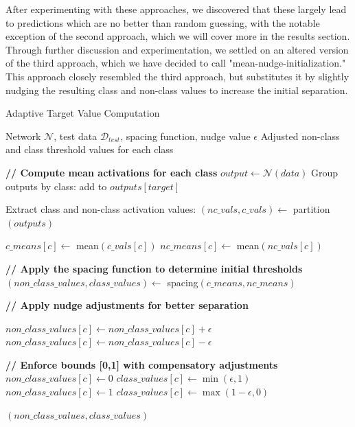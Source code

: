 \documentclass[12pt,fleqn,a4paper]{article}
\begin{document}
After experimenting with these approaches, we discovered that these largely lead to predictions which are no better than random guessing, with the notable exception of the second approach, which we will cover more in the results section. Through further discussion and experimentation, we settled on an altered version of the third approach, which we have decided to call "mean-nudge-initialization."
This approach closely resembled the third approach, but substitutes it by slightly nudging the resulting class and non-class values to increase the initial separation. 

\begin{algorithm}
\caption{Adaptive Target Value Computation}
\label{alg:adaptive_threshold}
\begin{algorithmic}[1]
\REQUIRE Network $\mathcal{N}$, test data $\mathcal{D}_{test}$, spacing function, nudge value $\epsilon$
\ENSURE Adjusted non-class and class threshold values for each class

\STATE \textbf{// Compute mean activations for each class}
    \STATE $output \leftarrow \mathcal{N}(data)$
    \STATE Group outputs by class: add to $outputs[target]$
\ENDFOR

\STATE Extract class and non-class activation values: $(nc\_vals, c\_vals) \leftarrow$ partition$(outputs)$

    \STATE $c\_means[c] \leftarrow$ mean$(c\_vals[c])$
    \STATE $nc\_means[c] \leftarrow$ mean$(nc\_vals[c])$
\ENDFOR

\STATE \textbf{// Apply the spacing function to determine initial thresholds}
\STATE $(non\_class\_values, class\_values) \leftarrow$ spacing$(c\_means, nc\_means)$

\STATE \textbf{// Apply nudge adjustments for better separation}

        \STATE $non\_class\_values[c] \leftarrow non\_class\_values[c] + \epsilon$
    \ELSE
        \STATE $non\_class\_values[c] \leftarrow non\_class\_values[c] - \epsilon$
    \ENDIF
    
    \STATE \textbf{// Enforce bounds [0,1] with compensatory adjustments}
        \STATE $non\_class\_values[c] \leftarrow 0$
        \STATE $class\_values[c] \leftarrow \min(\epsilon, 1)$
        \STATE $non\_class\_values[c] \leftarrow 1$
        \STATE $class\_values[c] \leftarrow \max(1 - \epsilon, 0)$
    \ENDIF
\ENDFOR

\RETURN $(non\_class\_values, class\_values)$
\end{algorithmic}
\end{algorithm}
\end{document}
